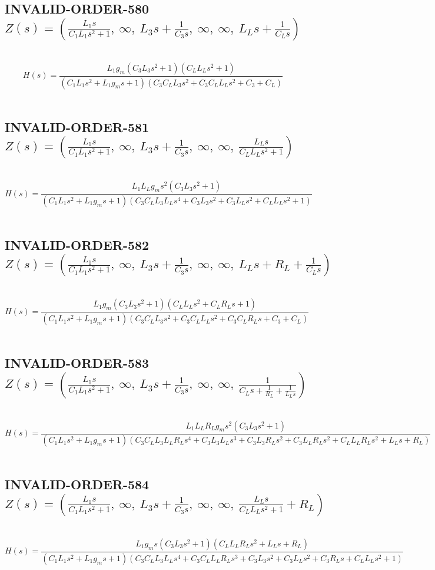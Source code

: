 \documentclass{article}
\begin{document}
\subsection{INVALID-ORDER-580 $Z(s) = \left( \frac{L_{1} s}{C_{1} L_{1} s^{2} + 1}, \  \infty, \  L_{3} s + \frac{1}{C_{3} s}, \  \infty, \  \infty, \  L_{L} s + \frac{1}{C_{L} s}\right)$ } \ 
\textbf{\[H(s) = \frac{L_{1} g_{m} \left(C_{3} L_{3} s^{2} + 1\right) \left(C_{L} L_{L} s^{2} + 1\right)}{\left(C_{1} L_{1} s^{2} + L_{1} g_{m} s + 1\right) \left(C_{3} C_{L} L_{3} s^{2} + C_{3} C_{L} L_{L} s^{2} + C_{3} + C_{L}\right)}\] } \ 
\subsection{INVALID-ORDER-581 $Z(s) = \left( \frac{L_{1} s}{C_{1} L_{1} s^{2} + 1}, \  \infty, \  L_{3} s + \frac{1}{C_{3} s}, \  \infty, \  \infty, \  \frac{L_{L} s}{C_{L} L_{L} s^{2} + 1}\right)$ } \ 
\textbf{\[H(s) = \frac{L_{1} L_{L} g_{m} s^{2} \left(C_{3} L_{3} s^{2} + 1\right)}{\left(C_{1} L_{1} s^{2} + L_{1} g_{m} s + 1\right) \left(C_{3} C_{L} L_{3} L_{L} s^{4} + C_{3} L_{3} s^{2} + C_{3} L_{L} s^{2} + C_{L} L_{L} s^{2} + 1\right)}\] } \ 
\subsection{INVALID-ORDER-582 $Z(s) = \left( \frac{L_{1} s}{C_{1} L_{1} s^{2} + 1}, \  \infty, \  L_{3} s + \frac{1}{C_{3} s}, \  \infty, \  \infty, \  L_{L} s + R_{L} + \frac{1}{C_{L} s}\right)$ } \ 
\textbf{\[H(s) = \frac{L_{1} g_{m} \left(C_{3} L_{3} s^{2} + 1\right) \left(C_{L} L_{L} s^{2} + C_{L} R_{L} s + 1\right)}{\left(C_{1} L_{1} s^{2} + L_{1} g_{m} s + 1\right) \left(C_{3} C_{L} L_{3} s^{2} + C_{3} C_{L} L_{L} s^{2} + C_{3} C_{L} R_{L} s + C_{3} + C_{L}\right)}\] } \ 
\subsection{INVALID-ORDER-583 $Z(s) = \left( \frac{L_{1} s}{C_{1} L_{1} s^{2} + 1}, \  \infty, \  L_{3} s + \frac{1}{C_{3} s}, \  \infty, \  \infty, \  \frac{1}{C_{L} s + \frac{1}{R_{L}} + \frac{1}{L_{L} s}}\right)$ } \ 
\textbf{\[H(s) = \frac{L_{1} L_{L} R_{L} g_{m} s^{2} \left(C_{3} L_{3} s^{2} + 1\right)}{\left(C_{1} L_{1} s^{2} + L_{1} g_{m} s + 1\right) \left(C_{3} C_{L} L_{3} L_{L} R_{L} s^{4} + C_{3} L_{3} L_{L} s^{3} + C_{3} L_{3} R_{L} s^{2} + C_{3} L_{L} R_{L} s^{2} + C_{L} L_{L} R_{L} s^{2} + L_{L} s + R_{L}\right)}\] } \ 
\subsection{INVALID-ORDER-584 $Z(s) = \left( \frac{L_{1} s}{C_{1} L_{1} s^{2} + 1}, \  \infty, \  L_{3} s + \frac{1}{C_{3} s}, \  \infty, \  \infty, \  \frac{L_{L} s}{C_{L} L_{L} s^{2} + 1} + R_{L}\right)$ } \ 
\textbf{\[H(s) = \frac{L_{1} g_{m} s \left(C_{3} L_{3} s^{2} + 1\right) \left(C_{L} L_{L} R_{L} s^{2} + L_{L} s + R_{L}\right)}{\left(C_{1} L_{1} s^{2} + L_{1} g_{m} s + 1\right) \left(C_{3} C_{L} L_{3} L_{L} s^{4} + C_{3} C_{L} L_{L} R_{L} s^{3} + C_{3} L_{3} s^{2} + C_{3} L_{L} s^{2} + C_{3} R_{L} s + C_{L} L_{L} s^{2} + 1\right)}\] } \ 
\end{document}

